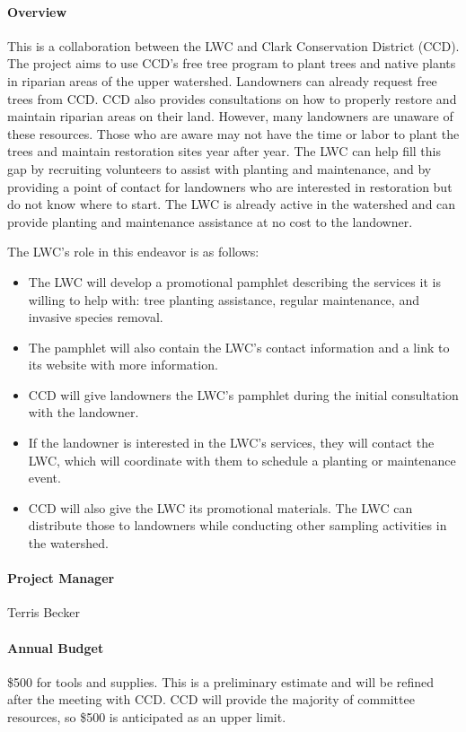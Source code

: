 \documentclass[letterpaper,11pt,leqno]{article}
\begin{document}
\paragraph{Overview} This is a collaboration between the LWC and Clark Conservation District (CCD). The project aims to use CCD's free tree program
to plant trees and native plants in riparian areas of the upper watershed. Landowners can already request free trees from CCD. CCD also provides consultations on how to
properly restore and maintain riparian areas on their land. However, many landowners are unaware of these resources. Those who are aware may not have the time or labor
to plant the trees and maintain restoration sites year after year. The LWC can help fill this gap by recruiting volunteers to assist with planting and maintenance, and by providing a point of contact for landowners who are interested in restoration but do not know where to start.
The LWC is already active in the watershed and can provide planting and maintenance assistance at no cost to the landowner.

The LWC's role in this endeavor is as follows:
\begin{itemize}
  \item The LWC will develop a promotional pamphlet describing the services it is willing to help with: tree planting assistance, regular maintenance, and invasive species removal.
  \item The pamphlet will also contain the LWC's contact information and a link to its website with more information.
  \item CCD will give landowners the LWC's pamphlet during the initial consultation with the landowner.
  \item If the landowner is interested in the LWC's services, they will contact the LWC, which will coordinate with them to schedule a planting or maintenance event.
  \item CCD will also give the LWC its promotional materials. The LWC can distribute those to landowners while conducting other sampling activities in the watershed.
\end{itemize}


\paragraph{Project Manager} Terris Becker

\paragraph{Annual Budget} \$500 for tools and supplies. This is a preliminary estimate and will be refined after the meeting with CCD. CCD will provide the majority of committee resources,
so \$500 is anticipated as an upper limit.
\end{document}
